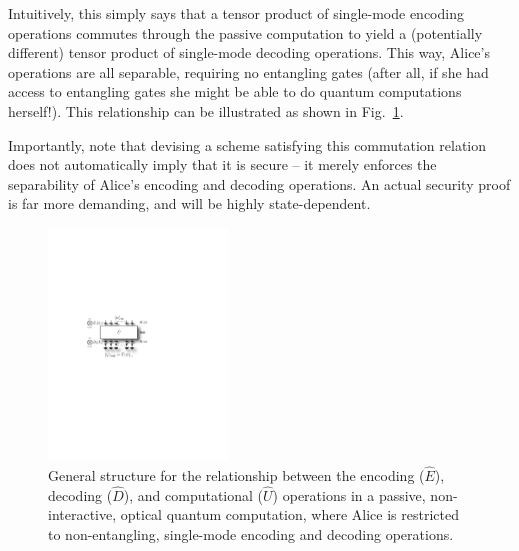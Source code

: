 Intuitively, this simply says that a tensor product of single-mode encoding operations commutes through the passive computation to yield a (potentially different) tensor product of single-mode decoding operations. This way, Alice's operations are all separable, requiring no entangling gates (after all, if she had access to entangling gates she might be able to do quantum computations herself!). This relationship can be illustrated as shown in Fig.~\ref{fig:gen_pass_hom}.

Importantly, note that devising a scheme satisfying this commutation relation does not automatically imply that it is secure -- it merely enforces the separability of Alice's encoding and decoding operations. An actual security proof is far more demanding, and will be highly state-dependent.

\begin{figure}[!htb]
\includegraphics[width=0.425\textwidth]{gen_pass_hom}
\caption{General structure for the relationship between the encoding ($\hat{E}$), decoding ($\hat{D}$), and computational ($\hat{U}$) operations in a passive, non-interactive, optical quantum computation, where Alice is restricted to non-entangling, single-mode encoding and decoding operations.} \label{fig:gen_pass_hom}
\end{figure}

